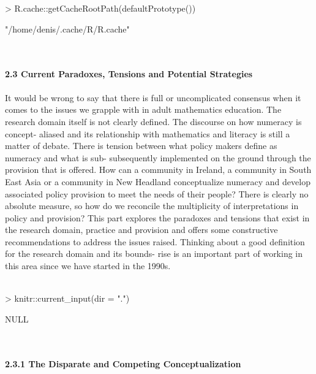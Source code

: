 \documentclass{article}
\begin{document}
\textit{\\\\}
\begin{Schunk}
\begin{Sinput}
> R.cache::getCacheRootPath(defaultPrototype())
\end{Sinput}
\begin{Soutput}
[1] "/home/denis/.cache/R/R.cache"
\end{Soutput}
\end{Schunk}
\textit{\\\\}
\textbf{ 2.3 Current Paradoxes, Tensions and Potential Strategies }
\textit{\\\\}
 It would be wrong to say that there is full or uncomplicated consensus when it
 comes to the issues we grapple with in adult mathematics education. The research
 domain itself is not clearly defined. The discourse on how numeracy is concept-
 aliased and its relationship with mathematics and literacy is still a matter of 
 debate.
 There is tension between what policy makers define as numeracy and what is sub-
   subsequently implemented on the ground through the provision that is offered. 
 How
 can a community in Ireland, a community in South East Asia or a community in
 New Headland conceptualize numeracy and develop associated policy provision
 to meet the needs of their people? There is clearly no absolute measure, so how
 do we reconcile the multiplicity of interpretations in policy and provision? This
 part explores the paradoxes and tensions that exist in the research domain, practice
 and provision and offers some constructive recommendations to address the issues
 raised. Thinking about a good definition for the research domain and its bounds-
   rise is an important part of working in this area since we have started in 
 the 1990s.
\textit{\\\\}
\begin{Schunk}
\begin{Sinput}
> knitr::current_input(dir = ".")
\end{Sinput}
\begin{Soutput}
NULL
\end{Soutput}
\end{Schunk}
\textit{\\\\}
\textbf{ 2.3.1 The Disparate and Competing Conceptualization }
\textit{\\\\} 
\end{document}
